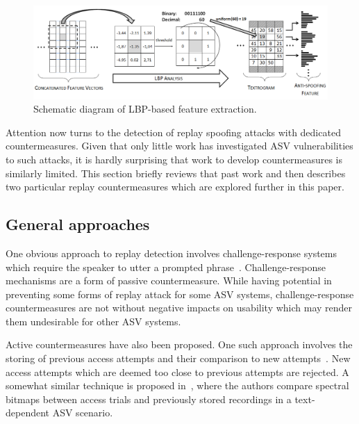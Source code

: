 \begin{figure}
	\includegraphics[width=1\linewidth]{Figs/LBP_idea.png}
	\caption{Schematic diagram of LBP-based feature extraction.}
	\label{fig:LBPfeature}
\end{figure}

Attention now turns to the detection of replay spoofing attacks with dedicated countermeasures.  Given that only little work has investigated ASV vulnerabilities to such attacks, it is hardly surprising that work to develop countermeasures is similarly limited.  This section briefly reviews that past work and then describes two particular replay countermeasures which are explored further in this paper.



\subsection{General approaches}

One obvious approach to replay detection involves challenge-response systems which require the speaker to utter a prompted phrase~\cite{Petrovska1998}. 
Challenge-response mechanisms are a form of passive countermeasure.
While having potential in preventing some forms of replay attack for some ASV systems, challenge-response countermeasures are not without negative impacts on usability which may render them undesirable for other ASV systems.

Active countermeasures have also been proposed.
One such approach involves the storing of previous access attempts and their comparison to new attempts~\cite{Shang2010}.
New access attempts which are deemed too close to previous attempts are rejected.
A somewhat similar technique is proposed in~\cite{Wu2014}, where the authors compare spectral bitmaps between access trials and previously stored recordings in a text-dependent ASV scenario.

